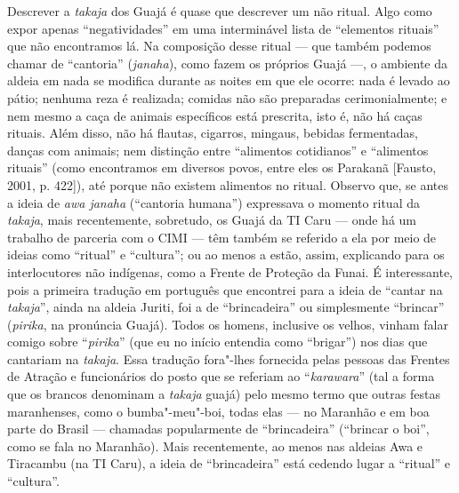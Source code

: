 Descrever a \emph{takaja} dos Guajá é quase que descrever um não ritual.
Algo como expor apenas ``negatividades'' em uma interminável lista de
``elementos rituais'' que não encontramos lá. Na composição desse ritual
--- que também podemos chamar de ``cantoria'' (\emph{janaha}), como fazem
os próprios Guajá ---, o ambiente da aldeia em nada se modifica durante as
noites em que ele ocorre: nada é levado ao pátio; nenhuma reza é
realizada; comidas não são preparadas cerimonialmente; e nem mesmo a
caça de animais específicos está prescrita, isto é, não há caças
rituais. Além disso, não há flautas, cigarros, mingaus, bebidas
fermentadas, danças com animais; nem distinção entre ``alimentos
cotidianos'' e ``alimentos rituais'' (como encontramos em diversos povos,
entre eles os Parakanã {[}Fausto, 2001, p. 422{]}), até porque não
existem alimentos no ritual. Observo que, se antes a ideia de \emph{awa
janaha} (``cantoria humana'') expressava o momento ritual da
\emph{takaja}, mais recentemente, sobretudo, os Guajá da TI Caru --- onde
há um trabalho de parceria com o CIMI --- têm também se referido a ela por
meio de ideias como ``ritual'' e ``cultura''; ou ao menos a estão,
assim, explicando para os interlocutores não indígenas, como a Frente de
Proteção da Funai. É interessante, pois a primeira tradução em português
que encontrei para a ideia de ``cantar na \emph{takaja}'', ainda na
aldeia Juriti, foi a de ``brincadeira'' ou simplesmente ``brincar''
(\emph{pirika}, na pronúncia Guajá). Todos os homens, inclusive os
velhos, vinham falar comigo sobre ``\emph{pirika}'' (que eu no início
entendia como ``brigar'') nos dias que cantariam na \emph{takaja}. Essa
tradução fora"-lhes fornecida pelas pessoas das Frentes de Atração e
funcionários do posto que se referiam ao ``\emph{karawara}'' (tal a
forma que os brancos denominam a \emph{takaja} guajá) pelo mesmo termo
que outras festas maranhenses, como o bumba"-meu"-boi, todas elas --- no
Maranhão e em boa parte do Brasil --- chamadas popularmente de
``brincadeira'' (``brincar o boi'', como se fala no Maranhão). Mais
recentemente, ao menos nas aldeias Awa e Tiracambu (na TI Caru), a ideia
de ``brincadeira'' está cedendo lugar a ``ritual'' e ``cultura''.

